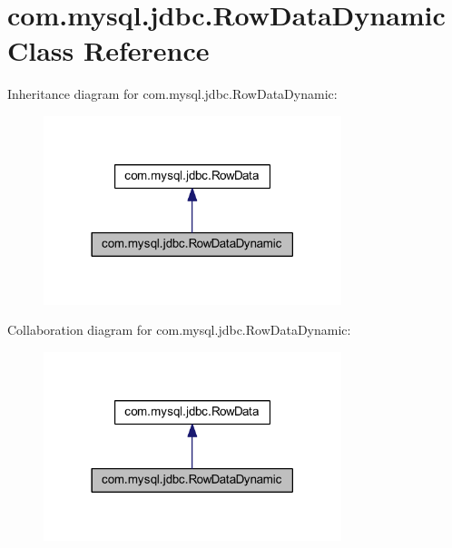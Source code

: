 \hypertarget{classcom_1_1mysql_1_1jdbc_1_1_row_data_dynamic}{}\section{com.\+mysql.\+jdbc.\+Row\+Data\+Dynamic Class Reference}
\label{classcom_1_1mysql_1_1jdbc_1_1_row_data_dynamic}


Inheritance diagram for com.\+mysql.\+jdbc.\+Row\+Data\+Dynamic\+:
\nopagebreak
\begin{figure}[H]
\begin{center}
\leavevmode
\includegraphics[width=246pt]{classcom_1_1mysql_1_1jdbc_1_1_row_data_dynamic__inherit__graph}
\end{center}
\end{figure}


Collaboration diagram for com.\+mysql.\+jdbc.\+Row\+Data\+Dynamic\+:
\nopagebreak
\begin{figure}[H]
\begin{center}
\leavevmode
\includegraphics[width=246pt]{classcom_1_1mysql_1_1jdbc_1_1_row_data_dynamic__coll__graph}
\end{center}
\end{figure}
